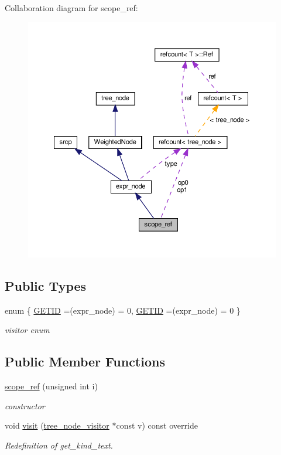 Collaboration diagram for scope\+\_\+ref\+:
\nopagebreak
\begin{figure}[H]
\begin{center}
\leavevmode
\includegraphics[width=350pt]{d6/d79/structscope__ref__coll__graph}
\end{center}
\end{figure}
\subsection*{Public Types}
\begin{DoxyCompactItemize}
\item 
enum \{ \hyperlink{structscope__ref_aa93f4d3dc24c061ec33661afc980402aac9a60e96d22d3ba0bcf73e6bc0891e9a}{G\+E\+T\+ID} =(expr\+\_\+node) = 0, 
\hyperlink{structscope__ref_aa93f4d3dc24c061ec33661afc980402aac9a60e96d22d3ba0bcf73e6bc0891e9a}{G\+E\+T\+ID} =(expr\+\_\+node) = 0
 \}\begin{DoxyCompactList}\small\item\em visitor enum \end{DoxyCompactList}
\end{DoxyCompactItemize}
\subsection*{Public Member Functions}
\begin{DoxyCompactItemize}
\item 
\hyperlink{structscope__ref_a1d9b96a3fcf6fcc4134ba46be547eeb7}{scope\+\_\+ref} (unsigned int i)
\begin{DoxyCompactList}\small\item\em constructor \end{DoxyCompactList}\item 
void \hyperlink{structscope__ref_ab9bfdbf6812bceab436f39ea51304058}{visit} (\hyperlink{classtree__node__visitor}{tree\+\_\+node\+\_\+visitor} $\ast$const v) const override
\begin{DoxyCompactList}\small\item\em Redefinition of get\+\_\+kind\+\_\+text. \end{DoxyCompactList}\end{DoxyCompactItemize}
